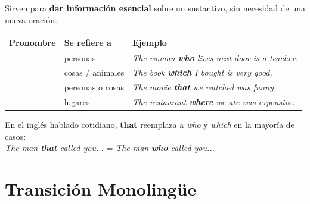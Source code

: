 \documentclass[12pt,a4paper]{article}
\begin{document}
\begin{cajagrammar}
Sirven para \textbf{dar información esencial} sobre un sustantivo, sin necesidad de una nueva oración.

\medskip
\begin{tabularx}{\textwidth}{@{} l l X @{}}
\toprule
\textbf{Pronombre} & \textbf{Se refiere a} & \textbf{Ejemplo} \\
\midrule
\eng{who} & personas & \textit{The woman \textbf{who} lives next door is a teacher.} \\
\eng{which} & cosas / animales & \textit{The book \textbf{which} I bought is very good.} \\
\eng{that} & personas o cosas & \textit{The movie \textbf{that} we watched was funny.} \\
\eng{where} & lugares & \textit{The restaurant \textbf{where} we ate was expensive.} \\
\bottomrule
\end{tabularx}

\medskip
\begin{cajaejemplo}[Nota]
En el inglés hablado cotidiano, \textbf{that} reemplaza a \textit{who} y \textit{which} en la mayoría de casos:\\
\textit{The man \textbf{that} called you...} = \textit{The man \textbf{who} called you...}
\end{cajaejemplo}
\end{cajagrammar}

\section{Transición Monolingüe}
\end{document}
